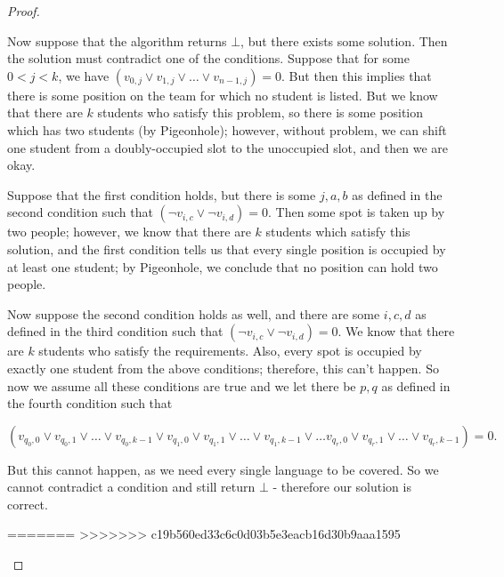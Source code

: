 \documentclass[11pt]{article}
\begin{document}
\begin{enumerate}
\begin{proof}
\begin{enumerate}
Now suppose that the algorithm returns $\bot$, but there exists some solution. Then the solution must contradict one of the conditions. Suppose that for some $0 < j < k$, we have $(v_{0, j} \vee v_{1, j} \vee \dots \vee v_{n  - 1, j}) = 0$. But then this implies that there is some position on the team for which no student is listed. But we know that there are $k$ students who satisfy this problem, so there is some position which has two students (by Pigeonhole); however, without problem, we can shift one student from a doubly-occupied slot to the unoccupied slot, and then we are okay.

Suppose that the first condition holds, but there is some $j, a, b$ as defined in the second condition such that $(\neg v_{i, c} \vee \neg v_{i, d}) = 0$. Then some spot is taken up by two people; however, we know that there are $k$ students which satisfy this solution, and the first condition tells us that every single position is occupied by at least one student; by Pigeonhole, we conclude that no position can hold two people.

Now suppose the second condition holds as well, and there are some $i, c, d$ as defined in the third condition such that $(\neg v_{i, c} \vee \neg v_{i, d}) = 0$. We know that there are $k$ students who satisfy the requirements. Also, every spot is occupied by exactly one student from the above conditions; therefore, this can't happen. So now we assume all these conditions are true and we let there be $p, q$ as defined in the fourth condition such that  

$$
(v_{q_0, 0} \vee v_{q_0, 1} \vee \dots \vee v_{q_0, k - 1} \vee v_{q_1, 0} \vee v_{q_1, 1} \vee \dots \vee v_{q_1, k - 1} \vee \dots v_{q_r, 0} \vee v_{q_r, 1}\vee \dots \vee v_{q_r, k - 1}) = 0.
$$

But this cannot happen, as we need every single language to be covered. So we cannot contradict a condition and still return $\bot$ - therefore our solution is correct.


=======
>>>>>>> c19b560ed33c6c0d03b5e3eacb16d30b9aaa1595
\end{enumerate}
\end{proof}
 
\end{enumerate}
\end{document}
